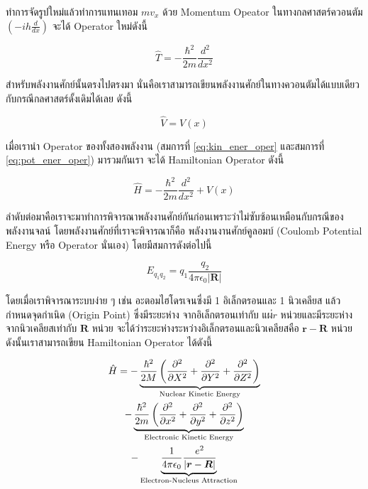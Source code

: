 \noindent ทำการจัดรูปใหม่แล้วทำการแทนเทอม $mv_{x}$ ด้วย Momentum Opeator ในทางกลศาสตร์ควอนตัม $(-ih\frac{d}{dx})$
จะได้ Operator ใหม่ดังนี้

\begin{equation}\label{eq:kin_ener_oper}
    \hat{T} = -\frac{\hbar^{2}}{2m}\frac{d^{2}}{dx^{2}}
\end{equation}

สำหรับพลังงานศักย์นั้นตรงไปตรงมา นั่นคือเราสามารถเขียนพลังงานศักย์ในทางควอนตัมได้แบบเดียวกับกรณีกลศาสตร์ดั้งเดิมได้เลย ดังนี้

\begin{equation}\label{eq:pot_ener_oper}
    \hat{V} = V(x)
\end{equation}

เมื่อเรานำ Operator ของทั้งสองพลังงาน (สมการที่ \eqref{eq:kin_ener_oper} และสมการที่ \eqref{eq:pot_ener_oper}) มารวมกันเรา%
จะได้ Hamiltonian Operator ดังนี้

\begin{equation}
    \hat{H} = -\frac{\hbar^{2}}{2m}\frac{d^{2}}{dx^{2}} + V(x)
\end{equation}

ลำดับต่อมาคือเราจะมาทำการพิจารณาพลังงานศักย์กันก่อนเพราะว่าไม่ซับซ้อนเหมือนกับกรณีของพลังงานจลน์ โดยพลังงานศักย์ที่เราจะพิจารณาก็คือ%
พลังงานงานศักย์คูลอมบ์ (Coulomb Potential Energy หรือ Operator นั่นเอง) โดยมีสมการดังต่อไปนี้

\begin{equation}
    E_{q_{1}q_{2}} = q_{1}\frac{q_{2}}{4\pi\epsilon_{0}|\bm{R}|}
\end{equation}

โดยเมื่อเราพิจารณาระบบง่าย ๆ เช่น อะตอมไฮโดรเจนซึ่งมี 1 อิเล็กตรอนและ 1 นิวเคลียส แล้วกำหนดจุดกำเนิด (Origin Point) ซึ่งมีระยะห่าง%
จากอิเล็กตรอนเท่ากับ $แผ่{r}$ หน่วยและมีระยะห่างจากนิวเคลียสเท่ากับ $\bm{R}$ หน่วย จะได้ว่าระยะห่างระหว่างอิเล็กตรอนและนิวเคลียสคือ
$\bm{r}-\bm{R}$ หน่วย ดังนั้นเราสามารถเขียน Hamiltonian Operator ได้ดังนี้

\begin{multline}\label{eq:hamil_hydrogen}
    \hat{H} = -\underbrace{\frac{\hbar^{2}}{2M} \left( \pdv[2]{X} + \pdv[2]{Y} + \pdv[2]{Z} \right)}_{%
        \text{Nuclear Kinetic Energy}}
    \\
    -\underbrace{\frac{\hbar^{2}}{2m} \left( \pdv[2]{x} + \pdv[2]{y} + \pdv[2]{z} \right)}_{%
        \text{Electronic Kinetic Energy}}
    \\
    -\underbrace{\frac{1}{4\pi\epsilon_{0}}\frac{e^{2}}{|\bm{r}-\bm{R}|}}_{%
        \text{Electron-Nucleus Attraction}}
\end{multline}

